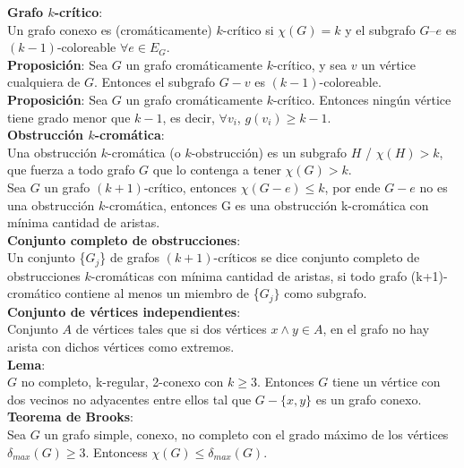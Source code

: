 \documentclass[a4paper,11pt]{report}
\begin{document}
{\bf Grafo $k$-crítico}: \\
Un grafo conexo es (cromáticamente) $k$-crítico si $\chi(G)=k$ y el subgrafo $G–e$ es $(k-1)$-coloreable $\forall e \in E_G$. \\
{\bf Proposición}: Sea $G$ un grafo cromáticamente $k$-crítico, y sea $v$ un vértice cualquiera de $G$. Entonces el subgrafo $G-v$ es $(k-1)$-coloreable.\\
{\bf Proposición}: Sea $G$ un grafo cromáticamente $k$-crítico. Entonces ningún vértice tiene grado menor que $k-1$, es decir, $\forall v_i$, $g(v_i) \geqslant k-1$.\\
{\bf Obstrucción $k$-cromática}: \\
Una obstrucción $k$-cromática (o $k$-obstrucción) es un subgrafo $H$ / $\chi(H)>k$, que fuerza a todo grafo $G$ que lo contenga a tener $\chi(G)>k$.\\
Sea $G$ un grafo $(k+1)$-crítico, entonces $\chi(G-e) \leqslant k$, por ende $G-e$ no es una obstrucción $k$-cromática, entonces G es una obstrucción k-cromática con mínima cantidad de aristas.\\
{\bf Conjunto completo de obstrucciones}:\\
Un conjunto \{$G_j$\} de grafos $(k+1)$-críticos se dice conjunto completo de obstrucciones $k$-cromáticas con mínima cantidad de aristas, si todo grafo (k+1)-cromático contiene al menos un miembro de \{$G_j\}$ como subgrafo. \\
{\bf Conjunto de vértices independientes}: \\
Conjunto $A$ de vértices tales que si dos vértices $x \wedge y \in A$, en el grafo no hay arista con dichos vértices como extremos.\\
{\bf Lema}:\\
$G$ no completo, k-regular, 2-conexo con $k \geqslant 3$. Entonces $G$ tiene un vértice con dos vecinos no adyacentes entre ellos tal que $G-\{x,y\}$ es un grafo conexo.\\
{\bf Teorema de Brooks}:\\
Sea $G$ un grafo simple, conexo, no completo con el grado máximo de los vértices $\delta_{max}(G) \geqslant 3$. Entoncess $\chi(G) \leqslant \delta_{max}(G)$.\\
\end{document}
